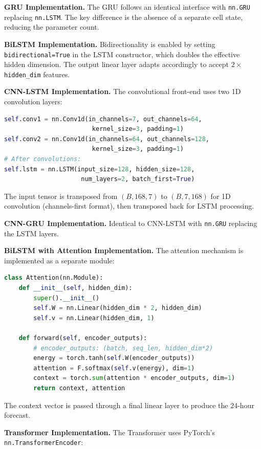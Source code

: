\textbf{GRU Implementation.} The GRU follows an identical interface with \texttt{nn.GRU} replacing \texttt{nn.LSTM}. The key difference is the absence of a separate cell state, reducing the parameter count.

\textbf{BiLSTM Implementation.} Bidirectionality is enabled by setting \texttt{bidirectional=True} in the LSTM constructor, which doubles the effective hidden dimension. The output linear layer adapts accordingly to accept $2 \times$ \texttt{hidden\_dim} features.

\textbf{CNN-LSTM Implementation.} The convolutional front-end uses two 1D convolution layers:

\begin{lstlisting}[language=Python]
self.conv1 = nn.Conv1d(in_channels=7, out_channels=64,
                        kernel_size=3, padding=1)
self.conv2 = nn.Conv1d(in_channels=64, out_channels=128,
                        kernel_size=3, padding=1)
# After convolutions:
self.lstm = nn.LSTM(input_size=128, hidden_size=128,
                     num_layers=2, batch_first=True)
\end{lstlisting}

The input tensor is transposed from $(B, 168, 7)$ to $(B, 7, 168)$ for 1D convolution (channels-first format), then transposed back for LSTM processing.

\textbf{CNN-GRU Implementation.} Identical to CNN-LSTM with \texttt{nn.GRU} replacing the LSTM layers.

\textbf{BiLSTM with Attention Implementation.} The attention mechanism is implemented as a separate module:

\begin{lstlisting}[language=Python]
class Attention(nn.Module):
    def __init__(self, hidden_dim):
        super().__init__()
        self.W = nn.Linear(hidden_dim * 2, hidden_dim)
        self.v = nn.Linear(hidden_dim, 1)
    
    def forward(self, encoder_outputs):
        # encoder_outputs: (batch, seq_len, hidden_dim*2)
        energy = torch.tanh(self.W(encoder_outputs))
        attention = F.softmax(self.v(energy), dim=1)
        context = torch.sum(attention * encoder_outputs, dim=1)
        return context, attention
\end{lstlisting}

The context vector is passed through a final linear layer to produce the 24-hour forecast.

\textbf{Transformer Implementation.} The Transformer uses PyTorch's \texttt{nn.TransformerEncoder}:

